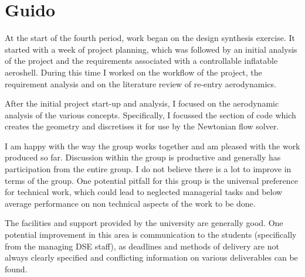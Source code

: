 
\section{Guido}
At the start of the fourth period, work began on the design synthesis exercise.  It started with a week of project planning, which was followed by an initial analysis of the project and the requirements associated with a controllable inflatable aeroshell.  During this time I worked on the workflow of the project, the requirement analysis and on the literature review of re-entry aerodynamics.  

After the initial project start-up and analysis, I focused on the aerodynamic analysis of the various concepts. Specifically, I focussed the section of code which creates the geometry and discretises it for use by the Newtonian flow solver. 

I am happy with the way the group works together and am pleased with the work produced so far. Discussion within the group is productive and generally has participation from the entire group.  I do not believe there is a lot to improve in terms of the group. One potential pitfall for this group is the universal preference for technical work, which could lead to neglected managerial tasks and below average performance on non technical aspects of the work to be done. 

The facilities and support provided by the university are generally good. One potential improvement in this area is communication to the students (specifically from the managing DSE staff), as deadlines and methods of delivery are not always clearly specified and conflicting information on various deliverables can be found.  

   
